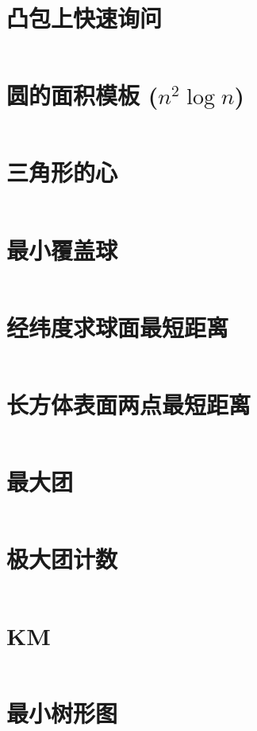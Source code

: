 \documentclass[titlepage,landscape,a4paper,10pt]{article}
\begin{document}
\begin{multicols}{2}
\begin{spacing}{0.8}
\section{凸包上快速询问}
\inputminted{cpp}{improve/PlayWithConvex.cpp}

\section{圆的面积模板 ($n^2\log n$)}
\inputminted{cpp}{src/圆的面积模板.cpp}

\section{三角形的心}
\inputminted{cpp}{improve/Triangle.cpp}

\section{最小覆盖球}
\inputminted{cpp}{src/最小覆盖球.cpp}

\section{经纬度求球面最短距离}
\inputminted{cpp}{src/经纬度求球面最短距离.cpp}

\section{长方体表面两点最短距离}
\inputminted{cpp}{src/长方体表面两点最短距离.cpp}

\section{最大团}
\inputminted{cpp}{improve/MaximumClique.cpp}

\section{极大团计数}
\inputminted{cpp}{src/极大团计数.cpp}

\section{KM}
\inputminted{cpp}{imporve/Hungarian.cpp}

\section{最小树形图}
\inputminted{cpp}{imporve/LiuZhu.cpp}


\end{spacing}
\end{multicols}
\end{document}
